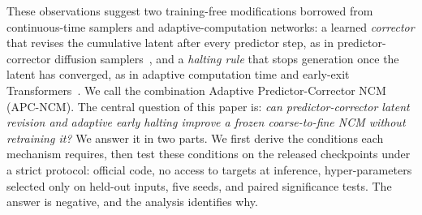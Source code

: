 These observations suggest two training-free modifications borrowed from continuous-time samplers and adaptive-computation networks: a learned \emph{corrector} that revises the cumulative latent after every predictor step, as in predictor-corrector diffusion samplers~\citep{song2021sde,zhao2023unipc}, and a \emph{halting rule} that stops generation once the latent has converged, as in adaptive computation time and early-exit Transformers~\citep{graves2016act,banino2021pondernet,elbayad2020depth,schuster2022calm}. We call the combination Adaptive Predictor-Corrector NCM (APC-NCM). The central question of this paper is: \emph{can predictor-corrector latent revision and adaptive early halting improve a frozen coarse-to-fine NCM without retraining it?} We answer it in two parts. We first derive the conditions each mechanism requires, then test these conditions on the released checkpoints under a strict protocol: official code, no access to targets at inference, hyper-parameters selected only on held-out inputs, five seeds, and paired significance tests. The answer is negative, and the analysis identifies why.

